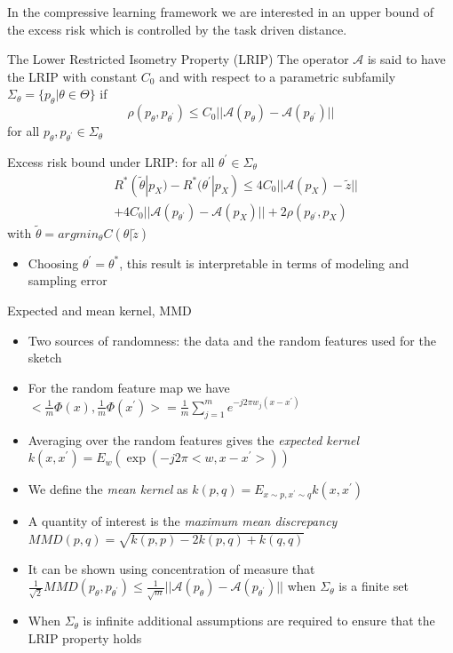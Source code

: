\documentclass{beamer}
\begin{document}
\begin{frame}
In the compressive learning framework we are interested in an upper bound of the excess risk which is controlled by the task driven distance.
	\begin{block}{The Lower Restricted Isometry Property (LRIP) } 
		The operator $\mathcal{A}$ is said to have the LRIP with constant $C_0$ and with respect to a parametric subfamily $\Sigma_{\theta}=\{p_{\theta}|\theta\in\Theta\}$ if
		\begin{equation*}
		    \rho(p_{\theta},p_{\theta^{'}})\leq C_0 ||\mathcal{A}(p_{\theta})-\mathcal{A}(p_{\theta^{'}})||
		\end{equation*}
		for all $p_{\theta},p_{\theta^{'}}\in\Sigma_{\theta}$
	\end{block}
	
	Excess risk bound under LRIP:  for all $\theta^{'}\in\Sigma_{\theta}$ 
    \begin{equation*}
    \begin{split}
        &R^*(\tilde{\theta}|p_X)-R^*(\theta^{'}|p_X)\leq 4C_0||\mathcal{A}(p_X)-\tilde{z}||\\
        &+4C_0||\mathcal{A}(p_{\theta^{'}})-\mathcal{A}(p_X)||+2\rho(p_{\theta^{'}},p_X)
    \end{split}
    \end{equation*}
with $\tilde{\theta}=argmin_{\theta}C(\theta|\tilde{z}) $

\begin{itemize}
    \item Choosing $\theta^{'}=\theta^*$, this result is interpretable in terms of modeling and sampling error
\end{itemize}
\end{frame}

\begin{frame}{Expected and mean kernel, MMD}
\begin{itemize}
    \item Two sources of randomness: the data and the random features used for the sketch
    \item For the random feature map we have $<\frac{1}{m}\Phi(x),\frac{1}{m}\Phi(x^{'})>=\frac{1}{m}\sum_{j=1}^m e^{-j2\pi w_j(x-x^{'})}$
    \item Averaging over the random features gives the \emph{expected kernel} $k(x,x^{'})=E_w(\exp(-j2\pi<w,x-x^{'}>))$
    \item We define the \emph{mean kernel} as
    $k(p,q)=E_{x\sim p, x^{'}\sim q} k(x,x^{'})$
    \item A quantity of interest is the \emph{maximum mean discrepancy}  $MMD(p,q)=\sqrt{k(p,p)-2k(p,q)+k(q,q)}$
    \item It can be shown using concentration of measure that
     $\frac{1}{\sqrt{2}}MMD(p_{\theta},p_{\theta^{'}})\leq \frac{1}{\sqrt{m}}||\mathcal{A}(p_{\theta})-\mathcal{A}(p_{\theta^{'}})||$ when $\Sigma_{\theta}$ is a finite set
     \item When $\Sigma_{\theta}$ is infinite additional assumptions are required to ensure that the LRIP property holds
\end{itemize}

\end{frame}
\end{document}
